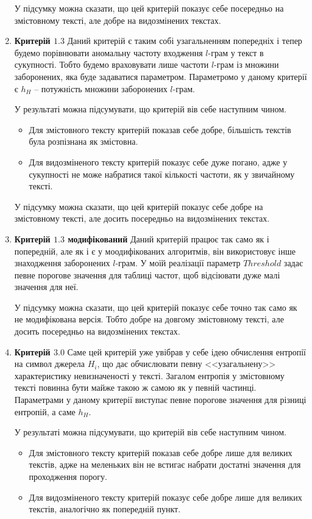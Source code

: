 \begin{enumerate}
        У підсумку можна сказати, що цей критерій показує себе посередньо на змістовному тексті, але добре на видозмінених текстах.
        
    \item \textbf{Критерій $1.3$}
        Даний критерій є таким собі узагальненням попередніх і тепер будемо порівнювати аномальну частоту входження $l$-грам у текст в сукупності. Тобто будемо враховувати лише частоти $l$-грам із множини заборонених, яка буде задаватися параметром. Параметромо у даному критерії є $h_H$ -- потужність множини заборонених $l$-грам.

        У результаті можна підсумувати, що критерій вів себе наступним чином.
        \begin{itemize}
            \item Для змістовного тексту критерій показав себе добре, більшість текстів була розпізнана як змістовна.
            \item Для видозміненого тексту критерій показує себе дуже погано, адже у сукупності не може набратися такої кількості частоти, як у звичайному тексті. 
        \end{itemize}

        У підсумку можна сказати, що цей критерій показує себе добре на змістовному тексті, але досить посередньо на видозмінених текстах.
        
    \item \textbf{Критерій $1.3$ модифікований}
        Даний критерій працює так само як і попередній, але як і є у моодифікованих алгоритмів, він використовує інше знаходження заборонених $l$-грам. У моїй реалізації параметр $Threshold$ задає певне порогове значення для таблиці частот, щоб відсіювати дуже малі значення для неї.

        У підсумку можна сказати, що цей критерій показує себе точно так само як не модифікована версія. Тобто добре на довгому змістовному тексті, але досить посередньо на видозмінених текстах.
        
    
    \item \textbf{Критерій $3.0$}
        Саме цей критерій уже увібрав у себе ідею обчислення ентропії на символ джерела $H_i$, що дає обчислювати певну <<узагальнену>> характеристику невизначеності у тексті. Загалом ентропія у змістовному тексті повинна бути майже такою ж самою як у певній частинці. Параметрами у даному критерії виступає певне порогове значення для різниці ентропій, а саме $h_H$.

        У результаті можна підсумувати, що критерій вів себе наступним чином.
        \begin{itemize}
            \item Для змістовного тексту критерій показав себе добре лише для великих текстів, адже на меленьких він не встигає набрати достатні значення для проходження порогу.
            \item Для видозміненого тексту критерій показує себе добре лише для великих текстів, аналогічно як попередній пункт. 
        \end{itemize}


\end{enumerate}
